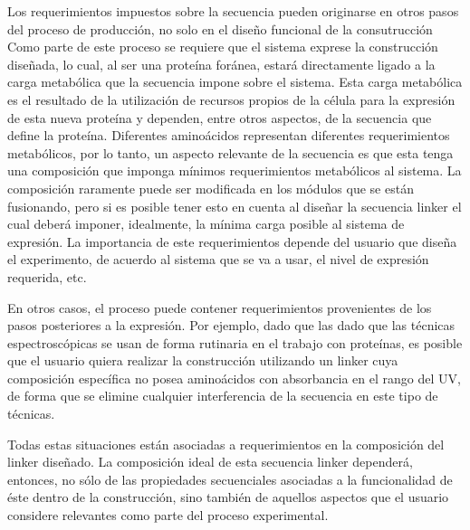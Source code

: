 Los requerimientos impuestos sobre la secuencia pueden originarse en otros pasos del proceso de producción, no solo en el diseño funcional de la consutrucción 
Como parte de este proceso se requiere que el sistema exprese la construcción diseñada, lo cual, al ser una proteína foránea, estará directamente ligado a la carga
metabólica que la secuencia impone sobre el sistema\cite{glick1995metabolic}. Esta carga metabólica es el resultado de la utilización de recursos propios de la célula para la expresión de esta nueva proteína y dependen, entre otros aspectos, 
de la secuencia que define la proteína. 
Diferentes aminoácidos representan diferentes requerimientos metabólicos, por lo tanto, un aspecto relevante de la secuencia es que esta tenga una composición que imponga mínimos requerimientos metabólicos al sistema. 
La composición raramente puede ser modificada en los módulos que se están fusionando, pero si es posible tener esto en cuenta al diseñar la secuencia linker el cual deberá imponer, idealmente, la mínima carga posible al sistema de expresión.
La importancia de este requerimientos depende del usuario que diseña el experimento, de acuerdo al sistema que se va a usar, el nivel de expresión requerida, etc.

En otros casos, el proceso puede contener requerimientos provenientes de los pasos posteriores a la expresión.
Por ejemplo, dado que las dado que las técnicas espectroscópicas se usan de forma rutinaria en el trabajo con proteínas, es posible que el usuario 
quiera realizar la construcción utilizando un linker cuya composición específica no posea aminoácidos con absorbancia en el rango del UV, 
de forma que se elimine cualquier interferencia de la secuencia en este tipo de técnicas.

Todas estas situaciones están asociadas a requerimientos en la composición del linker diseñado. 
La composición ideal de esta secuencia linker dependerá, entonces, no sólo de las propiedades secuenciales asociadas a la funcionalidad de éste dentro de la construcción, sino también de aquellos aspectos 
que el usuario considere relevantes como parte del proceso experimental.






